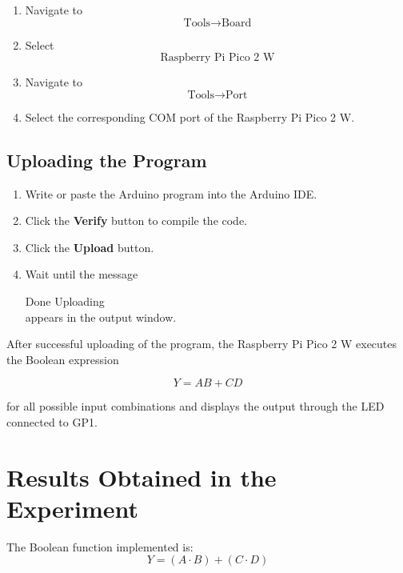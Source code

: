 \documentclass[12pt,a4paper]{article}
\begin{document}
\begin{enumerate}
    \item Navigate to
    \[
    \text{Tools} \rightarrow \text{Board}
    \]

    \item Select
    \[
    \text{Raspberry Pi Pico 2 W}
    \]

    \item Navigate to
    \[
    \text{Tools} \rightarrow \text{Port}
    \]

    \item Select the corresponding COM port of the Raspberry Pi Pico 2 W.
\end{enumerate}

\subsection{Uploading the Program}

\begin{enumerate}
    \item Write or paste the Arduino program into the Arduino IDE.
    \item Click the \textbf{Verify} button to compile the code.
    \item Click the \textbf{Upload} button.
    \item Wait until the message

Done Uploading\\
appears in the output window.
\end{enumerate}


After successful uploading of the program, the Raspberry Pi Pico 2 W executes the Boolean expression

$$
Y = AB + CD
$$

for all possible input combinations and displays the output through the LED connected to GP1.
\section{Results Obtained in the Experiment}

The Boolean function implemented is:
$$
Y = (A \cdot B) + (C \cdot D)
$$
\end{document}

